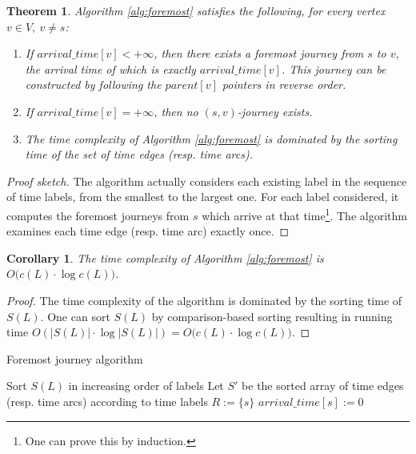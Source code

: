 \documentclass[a4paper,UKenglish]{article}
\newtheorem{theorem}{Theorem}
\newtheorem{corollary}{Corollary}
\begin{document}
\begin{theorem}
Algorithm \ref{alg:foremost} satisfies the following, for every vertex $v \in V,~v\not=s$:
\begin{enumerate}[label=(\alph*)]
\item If $arrival\_time[v] < + \infty$, then there exists a foremost journey from $s$ to $v$, the arrival time of which is exactly $arrival\_time[v]$. This journey can be constructed by following the $parent[v]$ pointers in reverse order.
\item If $arrival\_time[v] = + \infty$, then no $(s,v)$-journey exists.
\item The time complexity of Algorithm \ref{alg:foremost} is dominated by the sorting time of the set of time edges (resp. time arcs).
\end{enumerate}
\end{theorem}
\begin{proof}[Proof sketch]
The algorithm actually considers each existing label in the sequence of time labels, from the smallest to the largest one. For each label considered, it computes the foremost journeys from $s$ which arrive at that time\footnote{One can prove this by induction.}. The algorithm examines each time edge (resp. time arc) exactly once.
\end{proof}

\begin{corollary}
The time complexity of Algorithm \ref{alg:foremost} is $O\big(c(L)\cdot \log{c(L)}\big)$.
\end{corollary}
\begin{proof}
The time complexity of the algorithm is dominated by the sorting time of $S(L)$. One can sort $S(L)$ by comparison-based sorting resulting in running time $O(|S(L)|\cdot \log{|S(L)|}) = O\big(c(L)\cdot \log{c(L)}\big)$.
\end{proof}

\begin{algorithm}[ht]
\caption{Foremost journey algorithm}
\label{alg:foremost}
\SetAlgoLined


Sort $S(L)$ in increasing order of labels 
Let $S'$ be the sorted array of time edges (resp. time arcs) according to time labels\;
$R:=\{s\}$  
$arrival\_time[s] := 0$\;

\end{algorithm}
\end{document}
